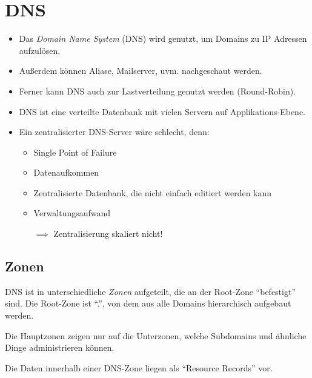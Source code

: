 \documentclass[a4paper, 11pt, accentcolor = tud3b]{tudreport}
\begin{document}
        \section{DNS}
            \begin{itemize}
            	\item Das \textit{Domain Name System} (DNS) wird genutzt, um Domains zu IP Adressen aufzulösen.
            	\item Außerdem können Aliase, Mailserver, uvm. nachgeschaut werden.
            	\item Ferner kann DNS auch zur Lastverteilung genutzt werden (Round-Robin).
            	\item DNS ist eine verteilte Datenbank mit vielen Servern auf Applikations-Ebene.
            	\item Ein zentralisierter DNS-Server wäre schlecht, denn:
	            	\begin{itemize}
	            		\item Single Point of Failure
	            		\item Datenaufkommen
	            		\item Zentralisierte Datenbank, die nicht einfach editiert werden kann
	            		\item Verwaltungsaufwand
	            		\item[\(\implies\)] Zentralisierung skaliert nicht!
	            	\end{itemize}
            \end{itemize}

            \subsection{Zonen}
	            DNS ist in unterschiedliche \textit{Zonen} aufgeteilt, die an der Root-Zone \enquote{befestigt} sind. Die Root-Zone ist \enquote{.}, von dem aus alle Domains hierarchisch aufgebaut werden.
	            
	            Die Hauptzonen zeigen nur auf die Unterzonen, welche Subdomains und ähnliche Dinge administrieren können.
	            
	            Die Daten innerhalb einer DNS-Zone liegen als \enquote{Resource Records} vor.
\end{document}
